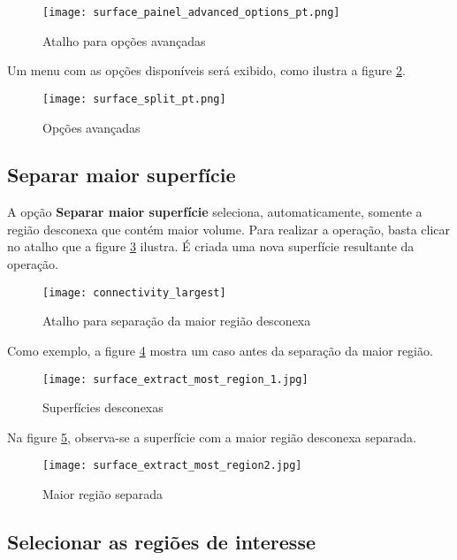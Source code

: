 \begin{figure}[!htb]
\centering
\texttt{[image: surface\_painel\_advanced\_options\_pt.png]}
\caption{Atalho para opções avançadas}
\label{fig:advanced_tools}
\end{figure}

\newpage

Um menu com as opções disponíveis será exibido, como ilustra a figure
\ref{fig:advanced_tools_expanded}.

\begin{figure}[!htb]
\centering
\texttt{[image: surface\_split\_pt.png]}
\caption{Opções avançadas}
\label{fig:advanced_tools_expanded}
\end{figure}

\subsection{Separar maior superfície}

A opção \textbf{Separar maior superfície} seleciona, automaticamente, somente a região
desconexa que contém maior volume. Para realizar a operação, basta clicar no atalho
que a figure \ref{fig:short_connectivity_largest} ilustra. É criada uma nova superfície
resultante da operação.

\begin{figure}[!htb]
\centering
\texttt{[image: connectivity\_largest]}
\caption{Atalho para separação da maior região desconexa}
\label{fig:short_connectivity_largest}
\end{figure}

Como exemplo, a figure \ref{fig:extract_most_region_1} mostra um caso antes da separação
da maior região.

\begin{figure}[!htb]
\centering
\texttt{[image: surface\_extract\_most\_region\_1.jpg]}
\caption{Superfícies desconexas}
\label{fig:extract_most_region_1}
\end{figure}

Na figure \ref{fig:extract_most_region2}, observa-se a superfície com a maior região
desconexa separada.

\begin{figure}[!htb]
\centering
\texttt{[image: surface\_extract\_most\_region2.jpg]}
\caption{Maior região separada}
\label{fig:extract_most_region2}
\end{figure}

\newpage

\subsection{Selecionar as regiões de interesse}


